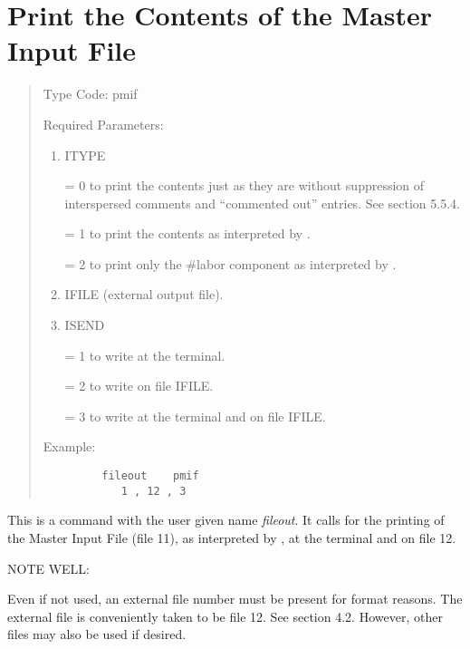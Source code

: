 \section{Print the Contents of the Master Input File}
\begin{quotation}
\noindent     Type Code:  pmif  
\vspace{5mm}

\noindent Required Parameters:
\begin{enumerate}
      \item  ITYPE

             = 0 to print the contents just as they are without suppression
               of interspersed \hspace*{1em}comments and ``commented out'' entries.  See
               section 5.5.4.

             = 1 to print the contents as interpreted by \Maryend.

             = 2 to print only the \#labor component as interpreted by \Maryend.

      \item  IFILE (external output file).

      \item  ISEND

              = 1 to write at the terminal.

              = 2 to write on file IFILE.

              = 3 to write at the terminal and on file IFILE.

\end{enumerate}

\vspace{5mm}
\noindent     Example:
\begin{verbatim}
         fileout    pmif
            1 , 12 , 3
\end{verbatim}
\end{quotation}
This is a command with the user given name {\em fileout}.  It calls for the
printing of the Master Input File (file 11), as interpreted by \Maryend, at
the terminal and on file 12.

\vspace{5mm}
     NOTE WELL:
\vspace{2mm}

           Even if not used, an external file number must be present for
format reasons.  The external file is conveniently taken to be file 12.
See section 4.2.  However, other files may also be used if desired.

